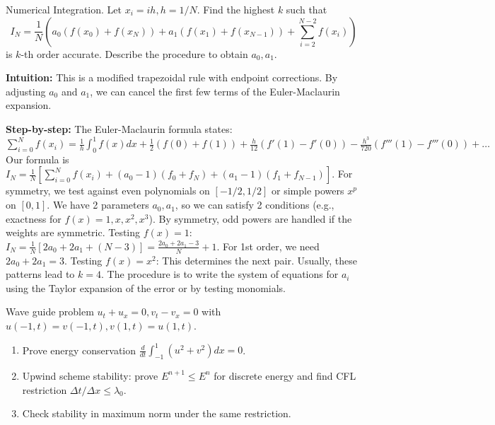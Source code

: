 \begin{exercise}
\label{applied:2013:9}
Numerical Integration. Let $x_i = ih, h=1/N$. Find the highest $k$ such that
\[ I_N = \frac{1}{N} \left( a_0(f(x_0) + f(x_N)) + a_1(f(x_1) + f(x_{N-1})) + \sum_{i=2}^{N-2} f(x_i) \right) \]
is $k$-th order accurate. Describe the procedure to obtain $a_0, a_1$.
\end{exercise}

\begin{solution}
\textbf{Intuition:} This is a modified trapezoidal rule with endpoint corrections. By adjusting $a_0$ and $a_1$, we can cancel the first few terms of the Euler-Maclaurin expansion.

\textbf{Step-by-step:}
The Euler-Maclaurin formula states:
$\sum_{i=0}^N f(x_i) = \frac{1}{h} \int_0^1 f(x) dx + \frac{1}{2}(f(0)+f(1)) + \frac{h}{12}(f'(1)-f'(0)) - \frac{h^3}{720}(f'''(1)-f'''(0)) + \dots$
Our formula is $I_N = \frac{1}{N} [\sum_{i=0}^N f(x_i) + (a_0-1)(f_0+f_N) + (a_1-1)(f_1+f_{N-1})]$.
For symmetry, we test against even polynomials on $[-1/2, 1/2]$ or simple powers $x^p$ on $[0, 1]$.
We have 2 parameters $a_0, a_1$, so we can satisfy 2 conditions (e.g., exactness for $f(x)=1, x, x^2, x^3$).
By symmetry, odd powers are handled if the weights are symmetric.
Testing $f(x)=1$: $I_N = \frac{1}{N} [2a_0 + 2a_1 + (N-3)] = \frac{2a_0+2a_1-3}{N} + 1$.
For 1st order, we need $2a_0 + 2a_1 = 3$.
Testing $f(x)=x^2$: This determines the next pair.
Usually, these patterns lead to $k=4$.
The procedure is to write the system of equations for $a_i$ using the Taylor expansion of the error or by testing monomials.
\end{solution}

\begin{exercise}
\label{applied:2013:10}
Wave guide problem $u_t + u_x = 0, v_t - v_x = 0$ with $u(-1,t)=v(-1,t), v(1,t)=u(1,t)$.
\begin{enumerate}
    \item[(1)] Prove energy conservation $\frac{d}{dt} \int_{-1}^1 (u^2 + v^2) dx = 0$.
    \item[(2)] Upwind scheme stability: prove $E^{n+1} \leq E^n$ for discrete energy and find CFL restriction $\Delta t / \Delta x \leq \lambda_0$.
    \item[(3)] Check stability in maximum norm under the same restriction.
\end{enumerate}
\end{exercise}


